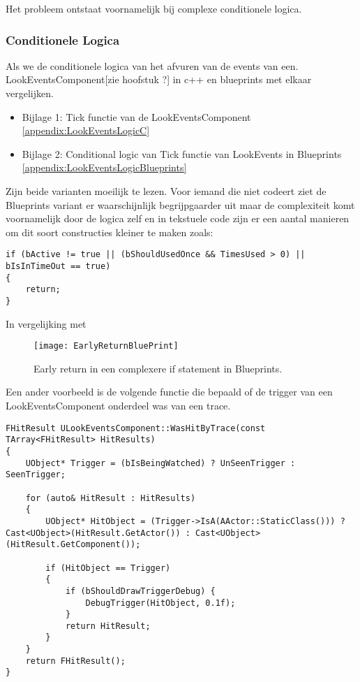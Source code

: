 Het probleem ontstaat voornamelijk bij complexe conditionele logica.

\subsubsection{Conditionele Logica}

Als we de conditionele logica van het afvuren van de events van een.
LookEventsComponent[zie hoofstuk ?] in c++ en blueprints met elkaar vergelijken.

\begin{itemize}
	\item Bijlage 1: Tick functie van de LookEventsComponent \ref{appendix:LookEventsLogicC}
	\item Bijlage 2: Conditional logic van Tick functie van LookEvents in Blueprints \ref{appendix:LookEventsLogicBlueprints}
\end{itemize}

Zijn beide varianten moeilijk te lezen. Voor iemand die niet codeert ziet de Blueprints variant er waarschijnlijk begrijpgaarder uit maar de complexiteit komt voornamelijk door de logica zelf en in tekstuele code zijn er een aantal manieren om dit soort constructies kleiner te maken zoals:

\begin{lstlisting}[caption=Early return in een complexere if statement in c++]
if (bActive != true || (bShouldUsedOnce && TimesUsed > 0) || bIsInTimeOut == true) 
{
	return;
}
\end{lstlisting}
In vergelijking met 

\begin{figure}[!ht]
  \centering
    \texttt{[image: EarlyReturnBluePrint]}
    \caption{Early return in een complexere if statement in Blueprints.}
\end{figure}

Een ander voorbeeld is de volgende functie die bepaald of de trigger van een LookEventsComponent onderdeel was van een trace.

\begin{lstlisting}[caption=Een functie die kijkt of de huidige component geraakt is door een trace]
FHitResult ULookEventsComponent::WasHitByTrace(const TArray<FHitResult> HitResults) 
{
	UObject* Trigger = (bIsBeingWatched) ? UnSeenTrigger : SeenTrigger;

	for (auto& HitResult : HitResults)
	{
		UObject* HitObject = (Trigger->IsA(AActor::StaticClass())) ? Cast<UObject>(HitResult.GetActor()) : Cast<UObject>(HitResult.GetComponent());	

		if (HitObject == Trigger)
		{
			if (bShouldDrawTriggerDebug) {
				DebugTrigger(HitObject, 0.1f);
			}
			return HitResult;
		}
	}
	return FHitResult();
}
\end{lstlisting}

